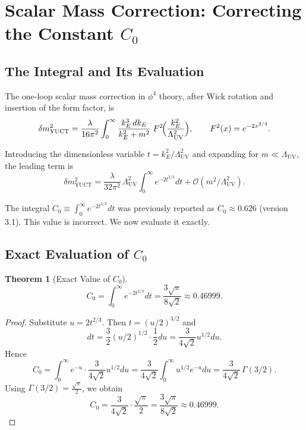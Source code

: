 \documentclass[12pt,a4paper]{article}
\newcommand{\LUV}{\Lambda_{\mathrm{UV}}}
\newtheorem{theorem}{Theorem}[section]
\theoremstyle{remark}
\begin{document}
	\section{Scalar Mass Correction: Correcting the Constant \(C_0\)}
	\label{sec:scalar}
	
	\subsection{The Integral and Its Evaluation}
	
	The one-loop scalar mass correction in \(\phi^4\) theory, after Wick rotation and insertion of the form factor, is
	\begin{equation}
		\delta m^2_{\mathrm{YUCT}} = \frac{\lambda}{16\pi^2} \int_0^{\infty} \frac{k_E^3\, dk_E}{k_E^2 + m^2}\; F^2\!\Bigl(\frac{k_E^2}{\LUV^2}\Bigr), \qquad F^2(x) = e^{-2x^{2/3}}.
		\label{eq:scalar_YUCT}
	\end{equation}
	
	Introducing the dimensionless variable \(t = k_E^2/\LUV^2\) and expanding for \(m \ll \LUV\), the leading term is
	\begin{equation}
		\delta m^2_{\mathrm{YUCT}} = \frac{\lambda}{32\pi^2}\,\LUV^2 \int_0^{\infty} e^{-2t^{2/3}} dt + \mathcal{O}(m^2/\LUV^2).
		\label{eq:scalar_lead}
	\end{equation}
	
	The integral \(C_0 \equiv \int_0^{\infty} e^{-2t^{2/3}} dt\) was previously reported as \(C_0 \approx 0.626\) (version 3.1).  This value is incorrect.  We now evaluate it exactly.
	
	\subsection{Exact Evaluation of \(C_0\)}
	
	\begin{theorem}[Exact Value of \(C_0\)]
		\label{thm:C0}
		\[
		C_0 = \int_0^{\infty} e^{-2t^{2/3}} dt = \frac{3\sqrt{\pi}}{8\sqrt{2}} \approx 0.46999.
		\]
	\end{theorem}
	
	\begin{proof}
		Substitute \(u = 2t^{2/3}\).  Then \(t = (u/2)^{3/2}\) and
		\[
		dt = \frac{3}{2} (u/2)^{1/2} \cdot \frac{1}{2} du = \frac{3}{4\sqrt{2}} u^{1/2} du.
		\]
		Hence
		\[
		C_0 = \int_0^{\infty} e^{-u} \cdot \frac{3}{4\sqrt{2}} u^{1/2} du = \frac{3}{4\sqrt{2}} \int_0^{\infty} u^{1/2} e^{-u} du = \frac{3}{4\sqrt{2}} \, \Gamma(3/2).
		\]
		Using \(\Gamma(3/2) = \frac{\sqrt{\pi}}{2}\), we obtain
		\[
		C_0 = \frac{3}{4\sqrt{2}} \cdot \frac{\sqrt{\pi}}{2} = \frac{3\sqrt{\pi}}{8\sqrt{2}} \approx 0.46999.
		\]
	\end{proof}
	
\end{document}
